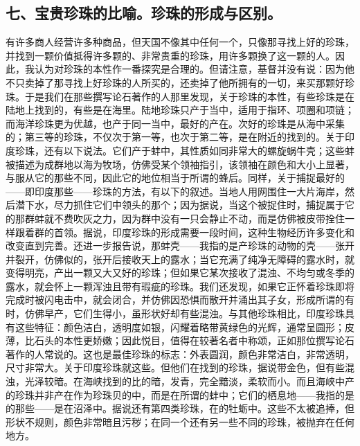 
\subsection{七、宝贵珍珠的比喻。珍珠的形成与区别。}

 有许多商人经营许多种商品，但天国不像其中任何一个，只像那寻找上好的珍珠，并找到一颗价值抵得许多颗的、非常贵重的珍珠，用许多颗换了这一颗的人。因此，我认为对珍珠的本性作一番探究是合理的。但请注意，基督并没有说：因为他不只卖掉了那寻找上好珍珠的人所买的，还卖掉了他所拥有的一切，来买那颗好珍珠。于是我们在那些撰写论石著作的人那里发现，关于珍珠的本性，有些珍珠是在陆地上找到的，有些是在海里。陆地珍珠只产于当中，适用于指环、项圈和项链；而海洋珍珠更为优越，也产于同一当中，最好的产在。次好的珍珠是从海中采集的；第三等的珍珠，不仅次于第一等，也次于第二等，是在附近的找到的。关于印度珍珠，还有以下说法。它们产于蚌中，其性质如同非常大的螺旋蜗牛壳；这些蚌被描述为成群地以海为牧场，仿佛受某个领袖指引，该领袖在颜色和大小上显著，与服从它的那些不同，因此它的地位相当于所谓的蜂后。同样，关于捕捉最好的——即印度那些——珍珠的方法，有以下的叙述。当地人用网围住一大片海岸，然后潜下水，尽力抓住它们中领头的那个；因为据说，当这个被捉住时，捕捉属于它的那群蚌就不费吹灰之力，因为群中没有一只会静止不动，而是仿佛被皮带拴住一样跟着群的首领。据说，印度珍珠的形成需要一段时间，这种生物经历许多变化和改变直到完善。还进一步报告说，那蚌壳——我指的是产珍珠的动物的壳——张开并裂开，仿佛似的，张开后接收天上的露水；当它充满了纯净无障碍的露水时，就变得明亮，产出一颗又大又好的珍珠；但如果它某次接收了混浊、不均匀或冬季的露水，就会怀上一颗浑浊且带有瑕疵的珍珠。我们还发现，如果它正怀着珍珠即将完成时被闪电击中，就会闭合，并仿佛因恐惧而散开并涌出其子女，形成所谓的有时，仿佛早产，它们生得小，虽形状好却有些混浊。与其他珍珠相比，印度珍珠具有这些特征：颜色洁白，透明度如银，闪耀着略带黄绿色的光辉，通常呈圆形；皮薄，比石头的本性更娇嫩；因此悦目，值得在较著名者中称颂，正如那位撰写论石著作的人常说的。这也是最佳珍珠的标志：外表圆润，颜色非常洁白，非常透明，尺寸非常大。关于印度珍珠就这些。但他们在找到的珍珠，据说带金色，但有些混浊，光泽较暗。在海峡找到的比的暗，发青，完全黯淡，柔软而小。而且海峡中产的珍珠并非产在作为珍珠贝的中，而是在所谓的蚌中；它们的栖息地——我指的是的那些——是在沼泽中。据说还有第四类珍珠，在的牡蛎中。这些不太被追捧，但形状不规则，颜色非常暗且污秽；在同一个还有另一些不同的珍珠，被抛弃在任何地方。\par

